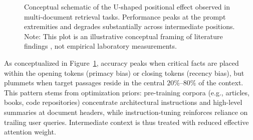 \documentclass[manuscript]{acmart}
\begin{document}
\begin{figure}[htbp]
\centering
{}
\caption{Conceptual schematic of the U-shaped positional effect observed in multi-document retrieval tasks. Performance peaks at the prompt extremities and degrades substantially across intermediate positions. Note: This plot is an illustrative conceptual framing of literature findings \cite{liu2024lost}, not empirical laboratory measurements.}
\label{fig:lost_in_middle}
\end{figure}

As conceptualized in Figure~\ref{fig:lost_in_middle}, accuracy peaks when critical facts are placed within the opening tokens (primacy bias) or closing tokens (recency bias), but plummets when target passages reside in the central $20\%\text{--}80\%$ of the context. This pattern stems from optimization priors: pre-training corpora (e.g., articles, books, code repositories) concentrate architectural instructions and high-level summaries at document headers, while instruction-tuning reinforces reliance on trailing user queries. Intermediate context is thus treated with reduced effective attention weight.
\end{document}
